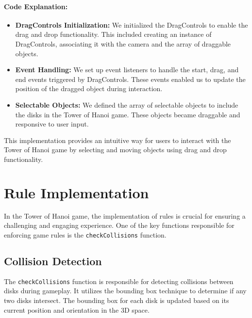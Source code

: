 \documentclass{article}
\begin{document}
\paragraph{Code Explanation:}

\begin{itemize}
    \item \textbf{DragControls Initialization:} We initialized the DragControls to enable the drag and drop functionality. This included creating an instance of DragControls, associating it with the camera and the array of draggable objects.

    \item \textbf{Event Handling:} We set up event listeners to handle the start, drag, and end events triggered by DragControls. These events enabled us to update the position of the dragged object during interaction.

    \item \textbf{Selectable Objects:} We defined the array of selectable objects to include the disks in the Tower of Hanoi game. These objects became draggable and responsive to user input.

\end{itemize}

This implementation provides an intuitive way for users to interact with the Tower of Hanoi game by selecting and moving objects using drag and drop functionality.


\section{Rule Implementation}

In the Tower of Hanoi game, the implementation of rules is crucial for ensuring a challenging and engaging experience. One of the key functions responsible for enforcing game rules is the \texttt{checkCollisions} function.

\subsection{Collision Detection}

The \texttt{checkCollisions} function is responsible for detecting collisions between disks during gameplay. It utilizes the bounding box technique to determine if any two disks intersect. The bounding box for each disk is updated based on its current position and orientation in the 3D space.
\end{document}
